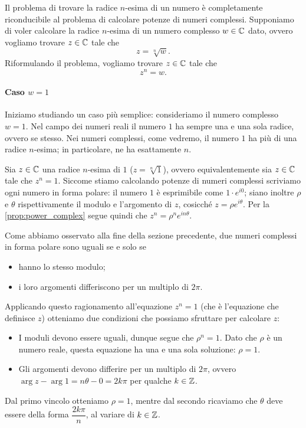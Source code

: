 Il problema di trovare la radice $n$-esima di un numero è completamente riconducibile al problema di calcolare potenze di numeri complessi. Supponiamo di voler calcolare la radice $n$-esima di un numero complesso $w  \in \mathbb{C}$ dato, ovvero vogliamo trovare $z \in \mathbb{C}$ tale che \begin{equation}
    z = \sqrt[n]{w}.
\end{equation} Riformulando il problema, vogliamo trovare $z \in \mathbb{C}$ tale che \begin{equation}
    z^n = w.
\end{equation}

\paragraph{Caso $w = 1$} Iniziamo studiando un caso più semplice: consideriamo il numero complesso $w = 1$. Nel campo dei numeri reali il numero $1$ ha sempre una e una sola radice, ovvero se stesso. Nei numeri complessi, come vedremo, il numero $1$ ha più di una radice $n$-esima; in particolare, ne ha esattamente $n$.

Sia $z \in \mathbb{C}$ una radice $n$-esima di $1$ ($z = \sqrt[n]{1}$), ovvero equivalentemente sia $z \in \mathbb{C}$ tale che $z^n = 1$. Siccome stiamo calcolando potenze di numeri complessi scriviamo ogni numero in forma polare: il numero $1$ è esprimibile come $1\cdot e^{i0}$; siano inoltre $\rho$ e $\theta$ rispettivamente il modulo e l'argomento di $z$, cosicché $z = \rho e^{i\theta}$. Per la \autoref{prop:power_complex} segue quindi che $z^n = \rho^n e^{in\theta}$.

Come abbiamo osservato alla fine della sezione precedente, due numeri complessi in forma polare sono uguali se e solo se \begin{itemize}
    \item hanno lo stesso modulo;
    \item i loro argomenti differiscono per un multiplo di $2\pi$.
\end{itemize} Applicando questo ragionamento all'equazione $z^n = 1$ (che è l'equazione che definisce $z$) otteniamo due condizioni che possiamo sfruttare per calcolare $z$:
\begin{itemize}
    \item I moduli devono essere uguali, dunque segue che $\rho^n = 1$. Dato che $\rho$ è un numero reale, questa equazione ha una e una sola soluzione: $\rho = 1$.
    \item Gli argomenti devono differire per un multiplo di $2\pi$, ovvero $\arg z - \arg 1 = n\theta - 0 = 2k\pi$ per qualche $k \in \mathbb{Z}$.
\end{itemize} Dal primo vincolo otteniamo $\rho = 1$, mentre dal secondo ricaviamo che $\theta$ deve essere della forma $\dfrac{2k\pi}{n}$, al variare di $k \in \mathbb{Z}$.

